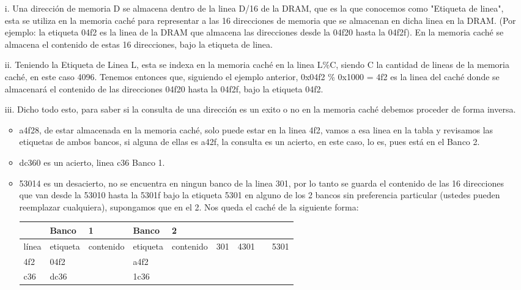 \documentclass[dcc,sol]{fcfmcourse}
\begin{document}
\begin{problems}
\begin{solution}
\begin{enumerate}
    \item[i.] Una dirección de memoria D se almacena dentro de la linea D/16 de la DRAM, que es la que conocemos como "Etiqueta de linea", esta se utiliza en la memoria caché para representar a las 16 direcciones de memoria que se almacenan en dicha linea en la DRAM. (Por ejemplo: la etiqueta 04f2 es la linea de la DRAM que almacena las direcciones desde la 04f20 hasta la 04f2f). En la memoria caché se almacena el contenido de estas 16 direcciones, bajo la etiqueta de linea.
    \item[ii.] Teniendo la Etiqueta de Linea L, esta se indexa en la memoria caché en la linea L\%C, siendo C la cantidad de lineas de la memoria caché, en este caso 4096. Tenemos entonces que, siguiendo el ejemplo anterior, 0x04f2 \% 0x1000 = 4f2 es la linea del caché donde se almacenará el contenido de las direcciones 04f20 hasta la 04f2f, bajo la etiqueta 04f2.
    \item[iii.] 
    Dicho todo esto, para saber si la consulta de una dirección es un exito o no en la memoria caché debemos proceder de forma inversa.
    \begin{itemize}
        \item a4f28, de estar almacenada en la memoria caché, solo puede estar en la linea 4f2, vamos a esa linea en la tabla y revisamos las etiquetas de ambos bancos, si alguna de ellas es a42f, la consulta es un acierto, en este caso, lo es, pues está en el Banco 2.
        \item dc360 es un acierto, linea c36 Banco 1.
        \item 53014 es un desacierto, no se encuentra en ningun banco de la linea 301, por lo tanto se guarda el contenido de las 16 direcciones que van desde la 53010 hasta la 5301f bajo la etiqueta 5301 en alguno de los 2 bancos sin preferencia particular (ustedes pueden reemplazar cualquiera), supongamos que en el 2. Nos queda el caché de la siguiente forma:

        \begin{table}[h]
        \centering
        \begin{tabular}{lllll}
        \hline
        & Banco & 1 & Banco & 2 \\ \hline
        línea & etiqueta & contenido & etiqueta & contenido &
        301 & 4301 & & 5301 & \\
        4f2 & 04f2 & & a4f2 & \\
        c36 & dc36 & & 1c36 & \\ \hline
        \end{tabular}
        \end{table}
                    

\end{itemize}
\end{enumerate}
\end{solution}
\end{problems}
\end{document}
